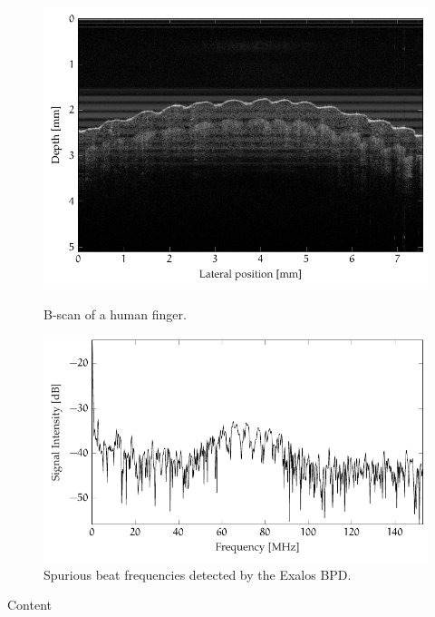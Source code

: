\begin{figure}[hbt]
	\myfloatalign
	{\includegraphics[width=\linewidth]{gfx/tikz/axsun/finger}}
	\caption{B-scan of a human finger.}\label{fig:finger}
\end{figure}%


\begin{figure}[hbt]
\myfloatalign
\includegraphics[width=\linewidth]{gfx/tikz/axsun/spurious-frequencies}
\caption{Spurious beat frequencies detected by the Exalos \ac{BPD}.}\label{fig:spurious-frequencies}
\end{figure}%


Content

